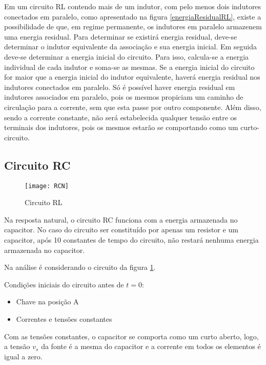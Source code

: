 \documentclass[12pt,fleqn]{book} %
\begin{document}
{\begin{remark}
Em um circuito RL contendo mais de um indutor, com pelo menos dois indutores conectados em paralelo, como apresentado na figura \ref{energiaResidualRL}, existe a possibilidade de que, em regime permanente, os indutores em paralelo armazenem uma energia residual. Para determinar se existirá energia residual, deve-se determinar o indutor equivalente da associação e sua energia inicial. Em seguida deve-se determinar a energia inicial do circuito. Para isso, calcula-se a energia individual de cada indutor e soma-se as mesmas. Se a energia inicial do circuito for maior que a energia inicial do indutor equivalente, haverá energia residual nos indutores conectados em paralelo. Só é possível haver energia residual em indutores associados em paralelo, pois os mesmos propiciam um caminho de circulação para a corrente, sem que esta passe por outro componente. Além disso, sendo a corrente constante, não será estabelecida qualquer tensão entre os terminais dos indutores, pois os mesmos estarão se comportando como um curto-circuito.
\end{remark}
        
        \subsection{Circuito RC}
        
        \begin{figure}[!htbp] \centering\texttt{[image: RCN]}
            \caption{Circuito RL}\label{RCN} 
        \end{figure} 
        
        Na resposta natural, o circuito RC funciona com a energia armazenada no capacitor. No caso do circuito ser constituído por apenas um resistor e um capacitor, após 10 constantes de tempo do circuito, não restará nenhuma energia armazenada no capacitor.
        
Na análise é considerando o circuito da figura \ref{RCN}.

Condições iniciais do circuito antes de $t=0$:

\begin{itemize}
\item Chave na posição A
\item Correntes e tensões constantes
\end{itemize}
        
Com as tensões constantes, o capacitor se comporta como um curto aberto, logo, a tensão $v_s$ da fonte é a mesma do capacitor e a corrente em todos os elementos é igual a zero.

}
\end{document}
